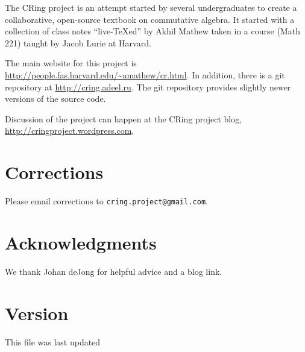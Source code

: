 The CRing project is an attempt started by several undergraduates to create
a collaborative, open-source textbook on commutative algebra. 
It started with a collection of class notes ``live-\TeX ed'' by Akhil Mathew
taken in a course (Math 221) taught by Jacob Lurie at Harvard.

The main website for this project is 
\url{http://people.fas.harvard.edu/~amathew/cr.html}.
In addition, there is a
git repository at \url{http://cring.adeel.ru}. The git repository provides 
slightly newer versions of the source code.

Discussion of the project can happen at the CRing project blog,
\url{http://cringproject.wordpress.com}.


\section*{Corrections}
Please email corrections to
\verb=cring.project@gmail.com=.

\section*{Acknowledgments}

We thank Johan deJong for helpful advice and a blog link.


\section*{Version}
This file was last updated 



